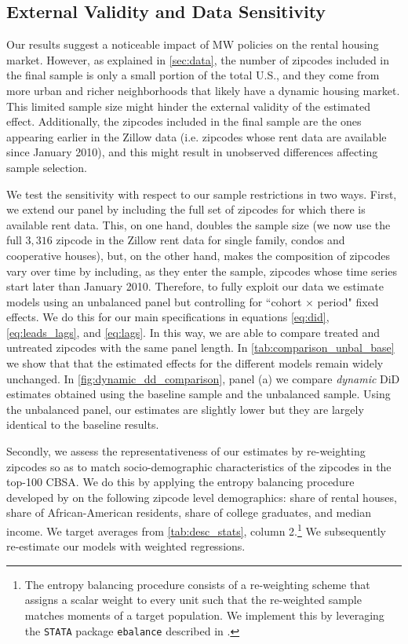 \subsection{External Validity and Data Sensitivity}\label{sec:sample_rest}

Our results suggest a noticeable impact of MW policies on the rental housing market. However, as 
explained in \autoref{sec:data}, the number of zipcodes included in the final sample is only a 
small portion of the total U.S., and they come from more urban and richer neighborhoods that likely 
have a dynamic housing market. This limited sample size might hinder the external validity of the 
estimated effect. Additionally, the zipcodes included in the final sample are the ones appearing 
earlier in the Zillow data (i.e. zipcodes whose rent data are available since January 2010), and 
this might result in unobserved differences affecting sample selection.

We test the sensitivity with respect to our sample restrictions in two ways. First, we extend our 
panel by including the full set of zipcodes for which there is available rent data. This, on one 
hand, doubles the sample size (we now use the full $3,316$ zipcode in the Zillow rent data for 
single family, condos and cooperative houses), but, on the other hand, makes the composition of 
zipcodes vary over time by including, as they enter the sample, zipcodes whose time series start 
later than January 2010. Therefore, to fully exploit our data we estimate models using an unbalanced 
panel but controlling for ``cohort $\times$ period" fixed effects. We do this for our main 
specifications in equations \eqref{eq:did}, \eqref{eq:leads_lags}, and \eqref{eq:lags}. In this way, 
we are able to compare treated and untreated zipcodes with the same panel length. In 
\autoref{tab:comparison_unbal_base} we show that that the estimated effects for the different models 
remain widely unchanged. In \autoref{fig:dynamic_dd_comparison}, panel (a) we compare 
\textit{dynamic} DiD estimates obtained using the baseline sample and the unbalanced sample. Using 
the unbalanced panel, our estimates are slightly lower but they are largely identical to the baseline 
results.

Secondly, we assess the representativeness of our estimates by re-weighting zipcodes so as to match 
socio-demographic characteristics of the zipcodes in the top-100 CBSA. We do this by applying the 
entropy balancing procedure developed by \cite{hainmueller2012entropy} on the following zipcode 
level demographics: share of rental houses, share of African-American residents, share of college 
graduates, and median income. We target averages from \autoref{tab:desc_stats}, column 
2.\footnote{The entropy balancing procedure consists of a re-weighting scheme that assigns a scalar 
	weight to every unit such that the re-weighted sample matches moments of a target population. We 
	implement this by leveraging the \texttt{STATA} package \texttt{ebalance} described in 
	\textcite{hainmueller2013ebalance}.} 
We subsequently re-estimate our models with weighted regressions.

